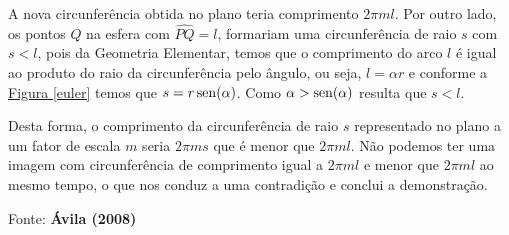 A nova circunferência obtida no plano teria comprimento $2\pi 𝑚l$. Por outro lado, os pontos $Q$ na esfera com $ \widehat{PQ} = l$, formariam uma circunferência de raio $s$ com $s < l$, pois da Geometria Elementar, temos que o comprimento do arco $l$ é igual ao produto do raio da circunferência pelo ângulo, ou seja, $l = \alpha r$ e conforme a \hyperref[euler]{Figura \ref{euler}} temos que $s =r \operatorname{sen} (\alpha)$. Como $\alpha > \operatorname{sen}(\alpha)$ resulta que $s < l$.

Desta forma, o comprimento da circunferência de raio $s$ representado no plano a um fator de escala $m$ seria $2\pi 𝑚𝑠$ que é menor que $2\pi 𝑚l$. Não podemos ter uma imagem com circunferência de comprimento igual a $2\pi 𝑚l$ e menor que $2\pi 𝑚l$ ao mesmo tempo, o que nos conduz a uma contradição e conclui a demonstração.

Fonte: \textbf{Ávila (2008)}

\cleardoublepage

